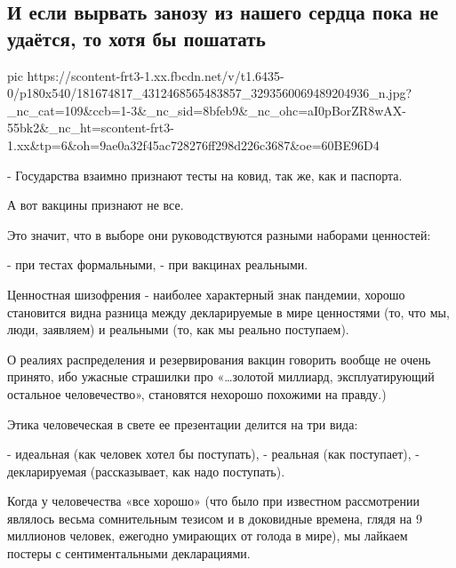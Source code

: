  
 
 
 
 
\subsection{И если вырвать занозу из нашего сердца пока не удаётся, то хотя бы пошатать}

\ifcmt
  pic https://scontent-frt3-1.xx.fbcdn.net/v/t1.6435-0/p180x540/181674817_4312468565483857_3293560069489204936_n.jpg?_nc_cat=109&ccb=1-3&_nc_sid=8bfeb9&_nc_ohc=aI0pBorZR8wAX-55bk2&_nc_ht=scontent-frt3-1.xx&tp=6&oh=9ae0a32f45ac728276ff298d226c3687&oe=60BE96D4
\fi

- Государства взаимно признают тесты на ковид,  так же, как и паспорта.

А вот вакцины признают не все.

Это значит, что в выборе они руководствуются разными наборами ценностей:

- при тестах формальными,
- при вакцинах реальными.

Ценностная шизофрения - наиболее характерный знак пандемии, хорошо становится
видна разница между декларируемые в мире ценностями (то, что мы, люди,
заявляем) и реальными (то, как мы реально поступаем). 

О реалиях распределения и резервирования вакцин говорить вообще не очень
принято, ибо ужасные страшилки про «…золотой миллиард, эксплуатирующий
остальное человечество», становятся нехорошо похожими на правду.)

Этика человеческая в свете ее презентации делится на три вида:

- идеальная (как человек хотел бы поступать),
- реальная (как поступает),
- декларируемая (рассказывает, как надо поступать).

Когда у человечества «все хорошо» (что было при известном рассмотрении являлось
весьма сомнительным тезисом и в доковидные времена, глядя на 9 миллионов
человек, ежегодно умирающих от голода в мире), мы лайкаем постеры с
сентиментальными декларациями.


